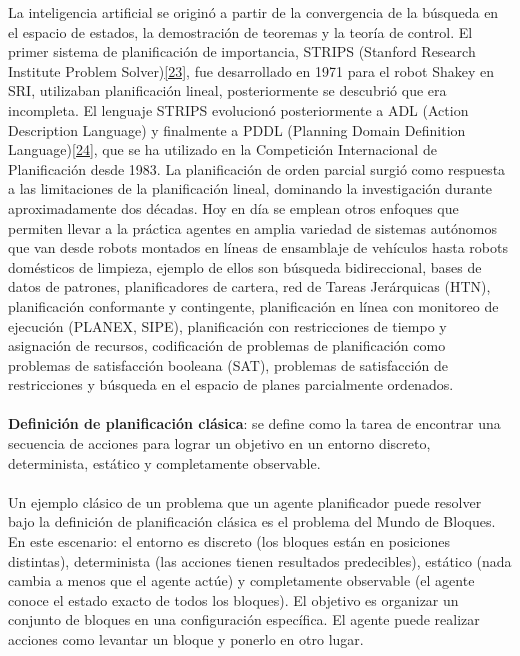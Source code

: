 \documentclass{article}
\begin{document}
    La inteligencia artificial se originó a partir de la convergencia de la búsqueda en el espacio de estados, la demostración de teoremas y la teoría de control.
        El primer sistema de planificación de importancia, STRIPS (Stanford Research Institute Problem Solver)\hyperref[sec:33]{[23]}, fue desarrollado en 1971 para el robot Shakey en SRI,
        utilizaban planificación lineal, posteriormente se descubrió que era incompleta. El lenguaje STRIPS evolucionó posteriormente a ADL (Action Description 
        Language) y finalmente a PDDL (Planning Domain Definition Language)\hyperref[sec:34]{[24]}, que se ha utilizado en la Competición Internacional de Planificación desde 1983. 
        La planificación de orden parcial surgió como respuesta a las limitaciones de la planificación lineal, dominando la investigación durante aproximadamente dos
        décadas. Hoy en día se emplean otros enfoques que permiten llevar a la práctica agentes en amplia variedad de sistemas autónomos que van desde robots montados 
        en líneas de ensamblaje de vehículos hasta robots domésticos de limpieza, ejemplo de ellos son búsqueda bidireccional, bases de datos de patrones, 
        planificadores de cartera, red de Tareas Jerárquicas (HTN), planificación conformante y contingente, planificación en línea con monitoreo de ejecución 
        (PLANEX, SIPE), planificación con restricciones de tiempo y asignación de recursos, codificación de problemas de planificación 
        como problemas de satisfacción booleana (SAT), problemas de satisfacción de restricciones y búsqueda en el espacio de planes parcialmente ordenados. \\ \\
    

        \textbf{Definición de planificación clásica}: se define como la tarea de encontrar una secuencia de acciones para lograr un objetivo en un entorno discreto, determinista, estático y completamente observable. \\ \\

        Un ejemplo clásico de un problema que un agente planificador puede resolver bajo la definición de planificación clásica es el problema del Mundo de Bloques. En este escenario: el entorno es discreto (los bloques están en posiciones distintas), determinista (las acciones tienen resultados predecibles), estático (nada cambia a menos que el agente actúe) y completamente observable (el agente conoce el estado exacto de todos los bloques). El objetivo es organizar un conjunto de bloques en una configuración específica. El agente puede realizar acciones como levantar un bloque y ponerlo en otro lugar. \\
\end{document}

